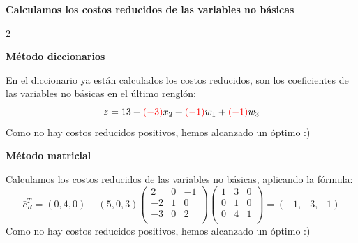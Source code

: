 \documentclass{article}
\begin{document}
    \begin{center}
        \textbf{Calculamos los costos reducidos de las variables no básicas}
    \end{center}
    \begin{multicols}{2}
        \raggedcolumns
        \begin{center}
            \textbf{Método diccionarios}
        \end{center}

        En el diccionario ya están calculados los costos reducidos, son los coeficientes de las variables no básicas
        en el último renglón:
        \[z    =  13  + {\color{red}(-3)} x_2  + {\color{red}(-1)} w_1   +  {\color{red}(-1)}w_3\]
        Como no hay costos reducidos positivos, hemos alcanzado un óptimo :)
        \columnbreak
        \begin{center}
            \textbf{Método matricial}
        \end{center}

        Calculamos los costos reducidos de las variables no básicas, aplicando la fórmula:
        \[\bar{c}_R^T =
        (0,4,0) - (5,0,3)
        \begin{pmatrix}
                2 & 0 & -1 \\
                -2 & 1 & 0 \\
                -3 & 0 & 2 \\
        \end{pmatrix}
        \begin{pmatrix}
                1 & 3 & 0 \\
                0 & 1 & 0 \\
                0 & 4 & 1 \\
        \end{pmatrix} = (-1, -3, -1)
        \]
        Como no hay costos reducidos positivos, hemos alcanzado un óptimo :)
    \end{multicols}
\end{document}

